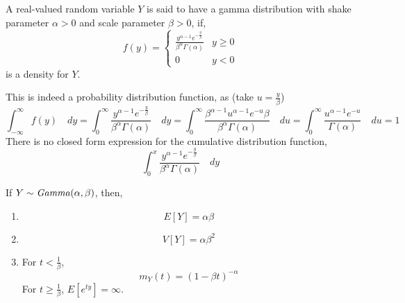 \begin{definition}
A real-valued random variable $Y$ is said to have a gamma distribution with
shake parameter $\alpha > 0$ and scale parameter $\beta > 0$, if,
\[
    f(y) = \begin{cases}
        \frac{y^{\alpha - 1} e^{-\frac{y}{\beta}}}{\beta^\alpha \Gamma(\alpha)}
            & y \geq 0                                                       \\
        0
            & y < 0                                     
    \end{cases}
\]
is a density for $Y$.
\end{definition}
This is indeed a probability distribution function, as (take $u =
\frac{y}{\beta}$)
\[
      \int_{-\infty}^{\infty} f(y) \quad dy
    = \int_{0}^{\infty} 
          \frac{y^{\alpha - 1}e^{-\frac{y}{\beta}}}{\beta^\alpha\Gamma(\alpha)}
      \quad dy
    = \int_{0}^{\infty} 
          \frac
          {\beta^{\alpha - 1} u^{\alpha - 1} e^{-u} \beta}
          {\beta^{\alpha} \Gamma(\alpha)}
      \quad du
    = \int_{0}^{\infty}
          \frac{u^{\alpha - 1}e^{-u}}{\Gamma(\alpha)}
      \quad du
    = 1
\]
There is no closed form expression for the cumulative distribution function,
\[
    \int_{0}^{x}
        \frac{y^{\alpha - 1}e^{-\frac{y}{\beta}}}{\beta^\alpha \Gamma(\alpha)}
    \quad dy
\]
\begin{theorem}
If $Y \sim \text{\emph{Gamma}}(\alpha, \beta)$, then,
\begin{enumerate}[noitemsep, topsep=0em]
\item \[
    E[Y] = \alpha \beta
\]
\item \[
    V[Y] = \alpha \beta^2
\]
\item For $t < \frac{1}{\beta}$,
\[
    m_Y(t) = (1 - \beta t)^{-\alpha}
\]
For $t \geq \frac{1}{\beta}$, $E[e^{ty}] = \infty$.
\end{enumerate}
\end{theorem}
